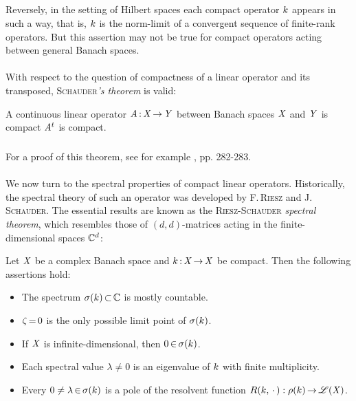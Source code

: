 \documentclass[11pt,twoside]{article}
\begin{document}
\subparagraph*{}
Reversely,
in the setting of Hilbert spaces 
each compact operator $k$ appears in such a way,
that is,
$k$ is the norm-limit of a convergent sequence of finite-rank operators.
But this assertion may not be true
for compact operators acting between general Banach spaces.

\paragraph*{}
With respect to the question of compactness of a linear operator and its
transposed,
\textsc{Schauder}\textit{'s theorem} is valid:

\begin{theorem}
A continuous linear operator $\mathit{A} {\,:\,} \mathit{X} {\,\to\,} \mathit{Y}$
between Banach spaces $\mathit{X}$ and $\mathit{Y}$ is compact
\iff $\mathit{A}^t$ is compact.
\end{theorem}

\subparagraph*{}
For a proof of this theorem, see for example \cite{Yo}, pp. 282-283.

\paragraph*{}
We now turn to the spectral properties of compact linear operators.
Historically,
the spectral theory of such an operator was developed
by \textsc{F.\,Riesz} and \textsc{J.\,Schauder}.
The essential results are known
as the \textsc{Riesz-Schauder} \textit{spectral theorem},
which resembles those of $(d,d)$-matrices
acting in the finite-dimensional spaces ${\mathbb{C}}^d$:

\begin{theorem}\label{RIESZ-SCHAUDER_SPECTRAL_THEOREM}
Let $\mathit{X}$ be a complex Banach space and
$k {\,:\,} \mathit{X} {\,\to\,} \mathit{X}$ be compact.
Then the following assertions hold:

\begin{itemize}[leftmargin=12pt]
\item[1.]
The spectrum $\sigma(k) {\,\subset\,} {\mathbb{C}}$ is mostly countable.

\item[2.]
$\zeta {\,=\,} 0$ is the only possible limit point of $\sigma(k)$.

\item[3.]
If $\mathit{X}$ is infinite-dimensional, then $0 {\,\in\,} \sigma(k)$.

\item[4.]
Each spectral value $\lambda \neq 0$ is an eigenvalue of $k$
with finite multi\-plicity.

\item[5.]
Every $0 \neq \lambda {\,\in\,} \sigma(k)$
is a pole of the resolvent function
$R(k,\, \cdot\, ):\rho(k) {\,\to\,} \mathscr{L}(\mathit{X})$.
\end{itemize}
\end{theorem}
\end{document}
